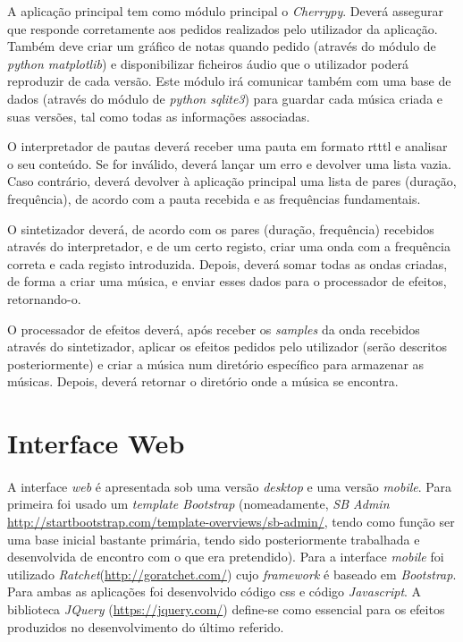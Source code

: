 \documentclass[11pt,openany,twoside]{report}
\begin{document}
A aplicação principal tem como módulo principal o \textit{Cherrypy}. Deverá assegurar que responde corretamente aos pedidos realizados pelo utilizador da aplicação. Também deve criar um gráfico de notas quando pedido (através do módulo de \textit{python matplotlib}) e disponibilizar ficheiros áudio que o utilizador poderá reproduzir de cada versão. Este módulo irá comunicar também com uma base de dados (através do módulo de \textit{python sqlite3}) para guardar cada música criada e suas versões, tal como todas as informações associadas.

O interpretador de pautas deverá receber uma pauta em formato \acs{rtttl} e analisar o seu conteúdo. Se for inválido, deverá lançar um erro e devolver uma lista vazia. Caso contrário, deverá devolver à aplicação principal uma lista de pares (duração, frequência), de acordo com a pauta recebida e as frequências fundamentais.

O sintetizador deverá, de acordo com os pares (duração, frequência) recebidos através do interpretador, e de um certo registo, criar uma onda com a frequência correta e cada registo introduzida. Depois, deverá somar todas as ondas criadas, de forma a criar uma música, e enviar esses dados para o processador de efeitos, retornando-o.

O processador de efeitos deverá, após receber os \textit{samples} da onda recebidos através do sintetizador, aplicar os efeitos pedidos pelo utilizador (serão descritos posteriormente) e criar a música num diretório específico para armazenar as músicas. Depois, deverá retornar o diretório onde a música se encontra.

\section{Interface Web}
\paragraph{ } A interface \textit{web} é apresentada sob uma versão \textit{desktop} e uma versão \textit{mobile}. Para primeira foi usado um \textit{template Bootstrap} (nomeadamente, \textit{SB Admin} \url{http://startbootstrap.com/template-overviews/sb-admin/}, tendo como função ser uma base inicial bastante primária, tendo sido posteriormente trabalhada e desenvolvida de encontro com o que era pretendido). Para a interface \textit{mobile} foi utilizado \textit{Ratchet}(\url{http://goratchet.com/}) cujo \textit{framework} é baseado em \textit{Bootstrap}. Para ambas as aplicações foi desenvolvido código \ac{css} e código \textit{Javascript}. A biblioteca \textit{JQuery} (\url{https://jquery.com/}) define-se como essencial para os efeitos produzidos no desenvolvimento do último referido.
\end{document}

